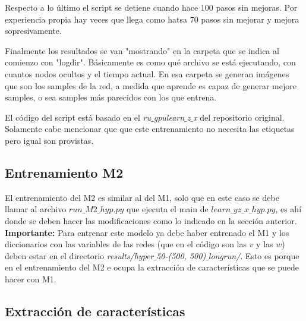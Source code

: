 \documentclass[letterpaper,11pt]{article} %
\begin{document}
	Respecto a lo último el script se detiene cuando hace 100 pasos sin mejoras. Por experiencia propia hay veces que llega como hatsa 70 pasos sin mejorar y mejora sopresivamente.
	
	Finalmente los resultados se van "mostrando" en la carpeta que se indica al comienzo con "logdir". Básicamente es como qué archivo se está ejecutando, con cuantos nodos ocultos y el tiempo actual. En esa carpeta se generan imágenes que son los samples de la red, a medida que aprende es capaz de generar mejore samples, o sea samples más parecidos con los que entrena.
	
	El código del script está basado en el \textit{ru$\_$gpulearn$\_$z$\_$x} del repositorio original.\\
	
	Solamente cabe mencionar que que este entrenamiento no necesita las etiquetas pero igual son provistas.
	
\subsection{Entrenamiento M2}

	El entrenamiento del M2 es similar al del M1, solo que en este caso se debe llamar al archivo $run\_M2\_hyp.py$ que ejecuta el main de $learn\_yz\_x\_hyp.py$, es ahí donde se deben hacer las modificaciones como lo indicado en la sección anterior.\\
	
	\textbf{Importante:} Para entrenar este modelo ya debe haber entrenado el M1 y los diccionarios con las variables de las redes (que en el código son las $v$ y las $w$) deben estar en el directorio \textit{results/hyper$\_$50-(500, 500)$\_$longrun/}. Esto es porque en el entrenamiento del M2 e ocupa la extracción de características que se puede hacer con M1.
	
\subsection{Extracción de características}
\end{document}
